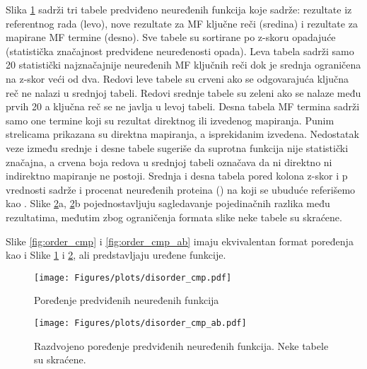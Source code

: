 Slika \ref{fig:disorder_cmp} sadrži tri tabele predviđeno neuređenih funkcija
koje sadrže: rezultate iz referentnog rada (levo), nove
rezultate za MF ključne reči (sredina) i rezultate za mapirane MF termine
(desno). Sve tabele su sortirane po z-skoru opadajuće (statistička značajnost
predviđene neuređenosti opada).  Leva tabela sadrži samo 20 statistički
najznačajnije neuređenih MF ključnih reči dok je srednja ograničena na z-skor
veći od dva.  Redovi leve tabele su crveni ako se odgovarajuća ključna reč ne
nalazi u srednjoj tabeli.  Redovi srednje tabele su zeleni ako se nalaze među
prvih 20 a ključna reč se ne javlja u levoj tabeli.  Desna tabela MF termina
sadrži samo one termine koji su rezultat direktnog ili izvedenog mapiranja.
Punim strelicama prikazana su direktna mapiranja, a isprekidanim izvedena.
Nedostatak veze između srednje i desne tabele sugeriše da suprotna funkcija
nije statistički značajna, a crvena boja redova u srednjoj tabeli označava da
ni direktno ni indirektno mapiranje ne postoji.  Srednja i desna tabela pored
kolona z-skor i p vrednosti sadrže i procenat neuređenih proteina
() na koji se ubuduće referišemo kao . Slike \ref{fig:disorder_cmp_ab}a, \ref{fig:disorder_cmp_ab}b
pojednostavljuju sagledavanje pojedinačnih razlika među rezultatima, međutim
zbog ograničenja formata slike neke tabele su skraćene.

Slike \ref{fig:order_cmp} i \ref{fig:order_cmp_ab}  imaju ekvivalentan format
poređenja kao i Slike \ref{fig:disorder_cmp} i \ref{fig:disorder_cmp_ab}, ali
predstavljaju uređene funkcije.



\clearpage

\begin{figure}[th]
\hspace*{-2.5cm} 
\texttt{[image: Figures/plots/disorder\_cmp.pdf]}
\decoRule
\caption {
  Poređenje predviđenih neuređenih funkcija
}
\label{fig:disorder_cmp}
\end{figure}

\clearpage

\begin{figure}[th]
\hspace*{-1.0cm} 
\texttt{[image: Figures/plots/disorder\_cmp\_ab.pdf]}
\decoRule
\caption {
  Razdvojeno poređenje predviđenih neuređenih funkcija. Neke tabele su skraćene.
}
\label{fig:disorder_cmp_ab}
\end{figure}



